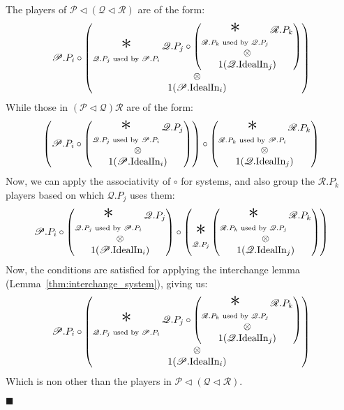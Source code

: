 \begin{lemma}
The players of $\mathscr{P} \lhd (\mathscr{Q} \lhd \mathscr{R})$ are of the form:
$$
  \mathscr{P}.P_i \circ
  \begin{pmatrix}
  \displaystyle \bigast_{\mathscr{Q}.P_j \text{ used by } \mathscr{P}.P_i } 
  \mathscr{Q}.P_j \circ
  \begin{pmatrix}
  \displaystyle \bigast_{\mathscr{R}.P_k \text{ used by } \mathscr{Q}.P_j } \mathscr{R}.P_k\cr
  \otimes\cr
  1(\mathscr{Q}.\tx{IdealIn}_j)
  \end{pmatrix}\cr
  \otimes\cr
  1(\mathscr{P}.\tx{IdealIn}_i)
  \end{pmatrix}
$$
While those in $(\mathscr{P} \lhd \mathscr{Q}) \mathscr{R}$ are of the form:
$$
  \left( \mathscr{P}.P_i \circ
  \begin{pmatrix}
  \displaystyle \bigast_{\mathscr{Q}.P_j \text{ used by } \mathscr{P}.P_i } 
  \mathscr{Q}.P_j\cr
  \otimes\cr
  1(\mathscr{P}.\tx{IdealIn}_i)
  \end{pmatrix}
  \right)
  \circ
  \begin{pmatrix}
    \displaystyle \bigast_{\mathscr{R}.P_k \text{ used by } \mathscr{P}.P_i } \mathscr{R}.P_k\cr
  \otimes\cr
  1(\mathscr{Q}.\tx{IdealIn}_j)
  \end{pmatrix}
$$
Now, we can apply the associativity of $\circ$ for systems, and also
group the $\mathscr{R}.P_k$ players based on which $\mathscr{Q}.P_j$ uses them:
$$
  \mathscr{P}.P_i \circ
  \begin{pmatrix}
  \displaystyle \bigast_{\mathscr{Q}.P_j \text{ used by } \mathscr{P}.P_i } 
  \mathscr{Q}.P_j\cr
  \otimes\cr
  1(\mathscr{P}.\tx{IdealIn}_i)
  \end{pmatrix}
  \circ
  \left(
    \displaystyle \bigast_{\mathscr{Q}.P_j}
  \begin{pmatrix}
  \displaystyle \bigast_{\mathscr{R}.P_k \text{ used by } \mathscr{Q}.P_j } \mathscr{R}.P_k
  \cr
  \otimes\cr
  1(\mathscr{Q}.\tx{IdealIn}_j)
  \end{pmatrix}
  \right)
$$
Now, the conditions are satisfied for applying the interchange lemma (Lemma~\ref{thm:interchange_system}),
giving us:
$$
  \mathscr{P}.P_i \circ
  \begin{pmatrix}
  \displaystyle \bigast_{\mathscr{Q}.P_j \text{ used by } \mathscr{P}.P_i } 
  \mathscr{Q}.P_j \circ
  \begin{pmatrix}
  \displaystyle \bigast_{\mathscr{R}.P_k \text{ used by } \mathscr{Q}.P_j } \mathscr{R}.P_k\cr
  \otimes\cr
  1(\mathscr{Q}.\tx{IdealIn}_j)
  \end{pmatrix}\cr
  \otimes\cr
  1(\mathscr{P}.\tx{IdealIn}_i)
  \end{pmatrix}
$$
Which is non other than the players in $\mathscr{P} \lhd (\mathscr{Q} \lhd \mathscr{R})$.

$\blacksquare$
\end{lemma}

